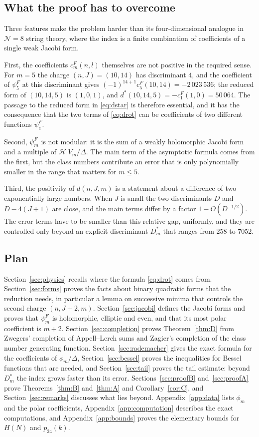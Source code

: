 \documentclass[11pt]{amsart}
\theoremstyle{definition}
\newcommand{\pf}{p_{24}}
\newcommand{\cF}{c^{F}}
\newcommand{\dstar}{d^{*}}
\newcommand{\Hc}{\mathcal{H}}
\begin{document}
\subsection*{What the proof has to overcome}
Three features make the problem harder than its four-dimensional analogue in $\mathcal N=8$ string theory, where the index is a finite combination of coefficients of a single weak Jacobi form.

First, the coefficients $\cF_m(n,l)$ themselves are not positive in the required sense. For $m=5$ the charge $(n,J)=(10,14)$ has discriminant $4$, and the coefficient of $\psi^F_5$ at this discriminant gives $(-1)^{14+1}\cF_5(10,14)=-2\,023\,536$; the reduced form of $(10,14,5)$ is $(1,0,1)$, and $\dstar(10,14,5)=-\cF_1(1,0)=50\,064$. The passage to the reduced form in \eqref{eq:dstar} is therefore essential, and it has the consequence that the two terms of \eqref{eq:drot} can be coefficients of two different functions $\psi^F_c$.

Second, $\psi^F_m$ is not modular: it is the sum of a weakly holomorphic Jacobi form and a multiple of $\Hc|V_m/\Delta$. The main term of the asymptotic formula comes from the first, but the class numbers contribute an error that is only polynomially smaller in the range that matters for $m\le5$.

Third, the positivity of $d(n,J,m)$ is a statement about a difference of two exponentially large numbers. When $J$ is small the two discriminants $D$ and $D-4(J+1)$ are close, and the main terms differ by a factor $1-O(D^{-1/2})$. The error terms have to be smaller than this relative gap, uniformly, and they are controlled only beyond an explicit discriminant $D^*_m$ that ranges from $258$ to $7052$.

\subsection*{Plan}
Section~\ref{sec:physics} recalls where the formula \eqref{eq:drot} comes from. Section~\ref{sec:forms} proves the facts about binary quadratic forms that the reduction needs, in particular a lemma on successive minima that controls the second charge $(n,J+2,m)$. Section~\ref{sec:jacobi} defines the Jacobi forms and proves that $\psi^F_m$ is holomorphic, elliptic and even, and that its most polar coefficient is $m+2$. Section~\ref{sec:completion} proves Theorem~\ref{thm:D} from Zwegers' completion of Appell--Lerch sums and Zagier's completion of the class number generating function. Section~\ref{sec:rademacher} gives the exact formula for the coefficients of $\phi_m/\Delta$, Section~\ref{sec:bessel} proves the inequalities for Bessel functions that are needed, and Section~\ref{sec:tail} proves the tail estimate: beyond $D^*_m$ the index grows faster than its error. Sections~\ref{sec:proofB} and~\ref{sec:proofA} prove Theorems~\ref{thm:B} and~\ref{thm:A} and Corollary~\ref{cor:C}, and Section~\ref{sec:remarks} discusses what lies beyond. Appendix~\ref{app:data} lists $\phi_m$ and the polar coefficients, Appendix~\ref{app:computation} describes the exact computations, and Appendix~\ref{app:bounds} proves the elementary bounds for $H(N)$ and $\pf(k)$.
\end{document}
